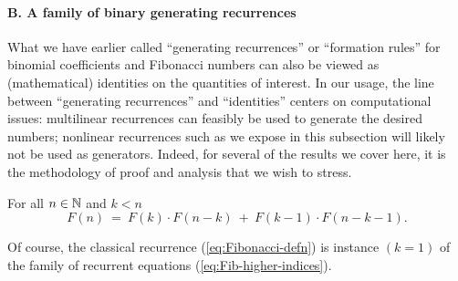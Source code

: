\paragraph{\small\sf B. A family of binary generating recurrences}

What we have earlier called ``generating recurrences'' or ``formation
rules'' for binomial coefficients and Fibonacci numbers can also be
viewed as (mathematical) identities on the quantities of interest.  In
our usage, the line between ``generating recurrences'' and
``identities'' centers on computational issues: multilinear
recurrences can feasibly be used to generate the desired numbers;
nonlinear recurrences such as we expose in this subsection will likely
not be used as generators.  Indeed, for several of the results we
cover here, it is the methodology of proof and analysis that we wish
to stress.

\begin{prop}
\label{thm:Fib-higher-indices}
For all $n \in \mathbb{N}$ and $k < n$
\begin{equation}
\label{eq:Fib-higher-indices}
F(n) \ = \ F(k) \cdot F(n-k) \ + \ F(k-1) \cdot F(n-k-1).
\end{equation}
\end{prop}

Of course, the classical recurrence (\ref{eq:Fibonacci-defn}) is
instance $(k = 1)$ of the family of recurrent equations
(\ref{eq:Fib-higher-indices}).

